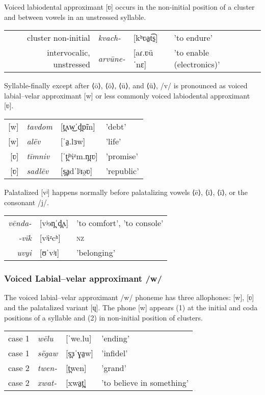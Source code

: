 Voiced labiodental approximant [ʋ] occurs in the non-initial position of a cluster and between vowels in an unstressed syllable.

\begin{tabular}{rlll}
cluster non-initial      & \textit{kvach-}   & {[}kʰʋa̠t͡s̠{]}     & 'to endure'                 \\
intervocalic, unstressed & \textit{arvūne-}  & {[}aɾ.ʋüˈnɛ{]}      & 'to enable (electronics)' \\
\end{tabular}

Syllable-finally except after ⟨ō⟩, ⟨ö⟩, ⟨ū⟩, and ⟨ü⟩, /v/ is pronounced as voiced labial–velar approximant [w] or less commonly voiced labiodental approximant [ʋ].

\begin{tabular}{rlll}
{[}w{]} & \textit{tavdom}   & {[}t̪ʌw͜ˈd̪ɒ̃m{]}     & 'debt'                 \\
{[}w{]} & \textit{alëv}     & {[}ˈa̠.lɜw{]}     & 'life'      \\
{[}ʋ{]} & \textit{tīmniv}  & {[}ˈt̪ʲʰiᶻm.n̪ɪʋ{]}      & 'promise' \\
{[}ʋ{]} & \textit{sadlēv}  & {[}s̪a̠dˈlʲɪə̯ʋ{]}      & 'republic' \\
\end{tabular}

Palatalized [vʲ] happens normally before palatalizing vowels ⟨ē⟩, ⟨i⟩, ⟨ī⟩, or the consonant /j/.

\begin{tabular}{rll}
\textit{vēnda-}   & {[}vʲɘn̪ˈd̪ʌ{]}     & 'to comfort', 'to console'                 \\
\textit{-vīk}     & {[}vʲiᶻcʰ{]}     & \textsc{nz}      \\
\textit{uvyi}  & {[}ʊˈvʲɪ{]}      & 'belonging' \\
\end{tabular}

\subsubsection{Voiced Labial–velar approximant /w/}
The voiced labial–velar approximant /w/ phoneme has three allophones: [w], [ʋ] and the palatalized variant [ɥ]. 
The phone [w] appears (1) at the initial and coda positions of a syllable and (2) in non-initial position of clusters.

\begin{tabular}{rlll}
case 1     & \textit{wēlu}    & {[}ˈwe.lu{]}    & 'ending'                 \\
case 1     & \textit{sëgaw}    & {[}s̪ɜˈɣa̠w{]} & 'infidel'                    \\
case 2     & \textit{twen-}   & {[}t̪wen{]}     & 'grand'                 \\
case 2     & \textit{xwat-}    & {[}xwa̠t̪{]} & 'to believe in something' \\
\end{tabular}

